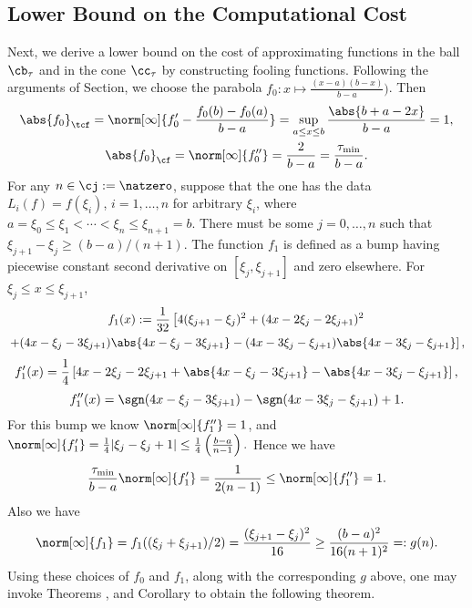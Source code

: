 \documentclass[]{elsarticle}
\theoremstyle{definition}
\theoremstyle{remark}
\newcommand{\Fnorm}[1]{\abs{#1}_{\cf}}
\newcommand{\Ftnorm}[1]{\abs{#1}_{\tcf}}
\begin{document}
\subsection{Lower Bound on the Computational Cost}
Next, we derive a lower bound on the cost of approximating functions in the ball $\cb_{\tau}$ and in the cone $\cc_{\tau}$ by constructing fooling functions. Following the arguments of Section, we choose the parabola $f_0: x \mapsto \frac{(x-a)(b-x)}{b-a})$. Then
\begin{gather*}
\Ftnorm{f_0}=\norm[\infty]{f'_0-\frac{f_0(b)-f_0(a)}{b-a}}=\sup_{a \le x \le b} \frac{\abs{b+a-2x}}{b-a} = 1, \\ \Fnorm{f_0}=\norm[\infty]{f''_0}=\frac{2}{b-a}= \frac{\tau_{\min}}{b-a}.
\end{gather*}
For any $n \in \cj:=\natzero$, suppose that the one has the data $L_i(f)=f(\xi_i)$, $i=1, \ldots, n$ for arbitrary $\xi_i$, where $a=\xi_0 \le \xi_1 < \cdots < \xi_n \le \xi_{n+1} = b$.  There must be some $j=0, \ldots, n$ such that $\xi_{j+1} - \xi_j \ge (b-a)/(n+1)$.  The function $f_{1}$ is defined as a bump having piecewise constant second derivative on $[\xi_j, \xi_{j+1}]$ and zero elsewhere.  For $\xi_{j} \le x \leq \xi_{j+1}$,
\begin{multline*}
f_{1}(x):=
\frac{1}{32} \left [4(\xi_{j+1}-\xi_j)^2 + (4x-2\xi_j-2\xi_{j+1})^2  \right. \\
\left. + (4x-\xi_j-3\xi_{j+1})\abs{4x-\xi_j-3\xi_{j+1}} -(4x-3\xi_j-\xi_{j+1})\abs{4x-3\xi_j-\xi_{j+1}} \right],
\end{multline*}
\[
f'_{1}(x)=
\frac{1}{4} \left [4x-2\xi_j-2\xi_{j+1} + \abs{4x-\xi_j-3\xi_{j+1}} -\abs{4x-3\xi_j-\xi_{j+1}} \right],
\]
\[
f''_{1}(x)=\sgn(4x-\xi_j-3\xi_{j+1}) - \sgn(4x-3\xi_j-\xi_{j+1}) + 1.
\]
For this bump we know $\norm[\infty]{f''_1}=1$, and $\norm[\infty]{f'_1}=\frac{1}{4}|\xi_j-\xi_j+1| \le \frac{1}{4}\left(\frac{b-a}{n-1}\right).$
Hence we have$$\frac{\tau_{\min}}{b-a}\norm[\infty]{f'_1} =\frac{1}{2(n-1)} \leq \norm[\infty]{f''_1}=1.$$ Also we have
\[
\norm[\infty]{f_1}=f_1((\xi_j+\xi_{j+1})/2)= \frac{(\xi_{j+1} - \xi_j)^2}{16} \ge \frac{(b-a)^2}{16(n+1)^2} =: g(n).
\]
Using these choices of $f_0$ and $f_1$, along with the corresponding $g$ above, one may invoke Theorems , and Corollary  to obtain the following theorem.
\end{document}
